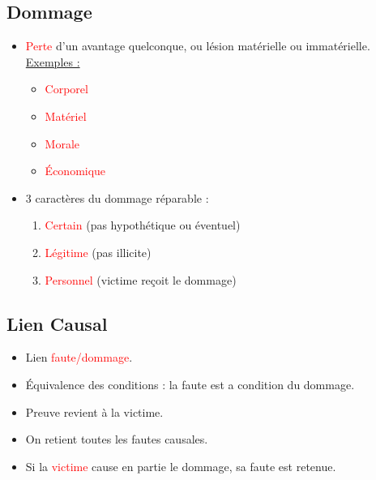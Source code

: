 \subsection{Dommage}
\begin{itemize}
	\item \textcolor{red}{Perte} d'un avantage quelconque, ou lésion matérielle ou immatérielle.\\
	\underline{Exemples :}
	\begin{itemize}
		\item \textcolor{red}{Corporel}
		\item \textcolor{red}{Matériel}
		\item \textcolor{red}{Morale}
		\item \textcolor{red}{Économique}
	\end{itemize}
	\item 3 caractères du dommage réparable :
	\begin{enumerate}
		\item \textcolor{red}{Certain} (pas hypothétique ou éventuel)
		\item \textcolor{red}{Légitime} (pas illicite)
		\item \textcolor{red}{Personnel} (victime reçoit le dommage)
	\end{enumerate}
\end{itemize}

\subsection{Lien Causal}
\begin{itemize}
	\item Lien \textcolor{red}{faute/dommage}.
	\item Équivalence des conditions : la faute est a condition du dommage.
	\item Preuve revient à la victime.
	\item On retient toutes les fautes causales.
	\item Si la \textcolor{red}{victime} cause en partie le dommage, sa faute est retenue.
\end{itemize}

